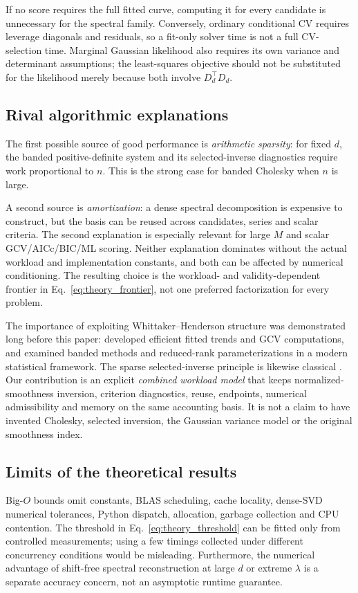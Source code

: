 If no score requires the full fitted curve, computing
it for every candidate is unnecessary for the spectral
family. Conversely, ordinary conditional CV requires
leverage diagonals and residuals, so a fit-only solver
time is not a full CV-selection time. Marginal
Gaussian likelihood also requires its own variance
and determinant assumptions; the
least-squares objective should not be substituted
for the likelihood merely because both involve
$D_d^\top D_d$.

\subsection{Rival algorithmic explanations}
The first possible source of good performance is
\emph{arithmetic sparsity}: for fixed $d$, the banded
positive-definite system and its selected-inverse
diagnostics require work proportional to $n$. This is the strong
case for banded Cholesky when $n$ is large.

A second source is \emph{amortization}: a dense spectral
decomposition is expensive to construct, but the basis
can be reused across candidates, series and scalar criteria.
The second explanation is especially relevant
for large $M$ and scalar GCV/AICc/BIC/ML scoring.
Neither explanation dominates without the
actual workload and implementation constants,
and both can be affected by numerical conditioning.
The resulting choice is the workload- and validity-dependent
frontier in Eq.~\eqref{eq:theory_frontier}, not one preferred
factorization for every problem.

The importance of exploiting Whittaker--Henderson
structure was demonstrated long before this paper:
\citet{weinert2007} developed efficient fitted
trends and GCV computations, and \citet{biessy2026}
examined banded methods and reduced-rank
parameterizations in a modern statistical framework.
The sparse selected-inverse principle is likewise
classical \citep{erisman1975}. Our contribution
is an explicit \emph{combined workload model}
that keeps normalized-smoothness inversion,
criterion diagnostics, reuse, endpoints,
numerical admissibility and memory on the
same accounting basis. It is not a claim
to have invented Cholesky, selected inversion,
the Gaussian variance model or the original
smoothness index.

\subsection{Limits of the theoretical results}
Big-$O$ bounds omit constants, BLAS scheduling,
cache locality, dense-SVD numerical tolerances,
Python dispatch, allocation, garbage collection
and CPU contention. The threshold in
Eq.~\eqref{eq:theory_threshold} can be fitted
only from controlled measurements; using a
few timings collected under different
concurrency conditions would be misleading.
Furthermore, the numerical advantage of
shift-free spectral reconstruction at
large $d$ or extreme $\lambda$ is a separate
accuracy concern, not an asymptotic runtime
guarantee.

